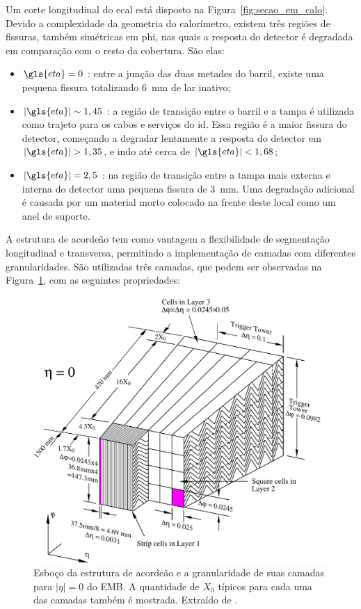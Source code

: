 Um corte longitudinal do \gls{ecal} está disposto na
Figura~\ref{fig:secao_em_calo}. Devido a complexidade da geometria do
calorímetro, existem três regiões de fissuras, também simétricas em \gls{phi}, 
nas quais a resposta do detector é degradada em comparação com o resto 
da cobertura. São elas:

\begin{itemize}
\item $\gls{eta}=0$ : entre a junção das duas metades do barril, existe uma 
pequena fissura totalizando 6~mm de \gls{lar} inativo;
\item $|\gls{eta}|\sim1,45$ : a região de transição entre o barril e a tampa é
utilizada como trajeto para os cabos e serviços do \gls{id}. Essa região é a
maior fissura do detector, começando a degradar lentamente a resposta do detector em
$|\gls{eta}|>1,35$, e indo até cerca de $|\gls{eta}|<1,68$;
\item $|\gls{eta}|=2,5$ : na região de transição entre a tampa mais externa e
interna do detector uma pequena fissura de 3~mm. Uma degradação adicional é
causada por um material morto colocado na frente deste local como um anel de
suporte.
\end{itemize}

A estrutura de acordeão
tem como vantagem a flexibilidade de segmentação longitudinal e transversa,
permitindo a implementação de camadas com diferentes granularidades. São
utilizadas três camadas, que podem ser observadas na
Figura~\ref{fig:cal_lar_camadas}, com as seguintes propriedades:

\begin{figure}[h!t]
\centering
\includegraphics[width=.6\textwidth]{figures/cal_lar_camadas.pdf}
\caption[Esboço da estrutura do acordeão e a granularidade de suas camadas para
o EMB]{Esboço da estrutura de acordeão e a granularidade de suas camadas para
$|\eta|=0$ do EMB. A quantidade de $X_0$ típicos para cada uma das camadas também é
mostrada. Extraído de \cite{cal_tdr}.}
\label{fig:cal_lar_camadas}
\end{figure}

